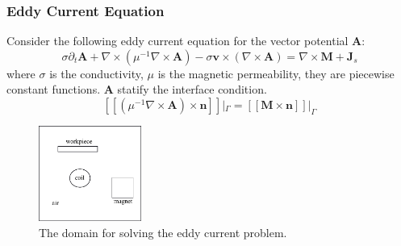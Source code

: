 \documentclass[notheorems,serif]{beamer}
\begin{document}
\begin{CJK}{UTF8}{gkai}
\begin{frame}
    \frametitle{Eddy Current Equation}
Consider the following eddy current equation for the 
vector potential $\boldsymbol{A}$:
$$
\sigma\partial_t \boldsymbol{A}+\nabla\times(\mu^{-1}\nabla\times \boldsymbol{A}) 
- \sigma\boldsymbol{v}\times (\nabla\times\boldsymbol{A}) = 
\nabla\times \boldsymbol{M} + \boldsymbol{J}_s
$$
where $\sigma$ is the conductivity, $\mu$ is the magnetic permeability, they are
piecewise constant functions. $\boldsymbol{A}$ statify the interface condition.
$$
[\![(\mu^{-1}\nabla\times \boldsymbol{A})\times \boldsymbol{n}]\!]|_{\Gamma} = 
[\![\boldsymbol{M}\times \boldsymbol{n}]\!]|_{\Gamma}
$$
\begin{figure}[htpb]
    \centering
    \includegraphics[width=0.3\textwidth]{../figures/movingmaxwell/eddycurrent_domain.pdf}
    \caption{The domain for solving the eddy current problem.}
\end{figure}
\end{frame}


\end{CJK}
\end{document}
